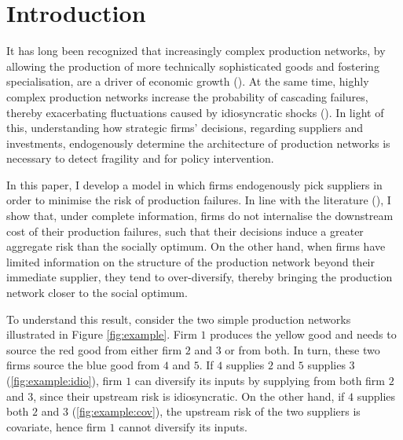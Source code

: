 \documentclass[../main.tex]{subfiles}
\begin{document}
    
\section{Introduction}

It has long been recognized that increasingly complex production networks, by allowing the production of more technically sophisticated goods and fostering specialisation, are a driver of economic growth (\cite{kremer_population_1993,acemoglu_endogenous_2020}). At the same time, highly complex production networks increase the probability of cascading failures, thereby exacerbating fluctuations caused by idiosyncratic shocks (\cite{acemoglu_network_2012,baqaee_macroeconomic_2019,guerrieri_macroeconomic_2020}). In light of this, understanding how strategic firms' decisions, regarding suppliers and investments, endogenously determine the architecture of production networks is necessary to detect fragility and for policy intervention. 

In this paper, I develop a model in which firms endogenously pick suppliers in order to minimise the risk of production failures. In line with the literature (\cite{elliott_supply_2022}), I show that, under complete information, firms do not internalise the downstream cost of their production failures, such that their decisions induce a greater aggregate risk than the socially optimum. On the other hand, when firms have limited information on the structure of the production network beyond their immediate supplier, they tend to over-diversify, thereby bringing the production network closer to the social optimum. 

To understand this result, consider the two simple production networks illustrated in Figure \ref{fig:example}. Firm $1$ produces the yellow good and needs to source the red good from either firm $2$ and $3$ or from both. In turn, these two firms source the blue good from $4$ and $5$. If $4$ supplies $2$ and $5$ supplies $3$ (\ref{fig:example:idio}), firm $1$ can diversify its inputs by supplying from both firm $2$ and $3$, since their upstream risk is idiosyncratic. On the other hand, if $4$ supplies both $2$ and $3$ (\ref{fig:example:cov}), the upstream risk of the two suppliers is covariate, hence firm $1$ cannot diversify its inputs.
\end{document}
